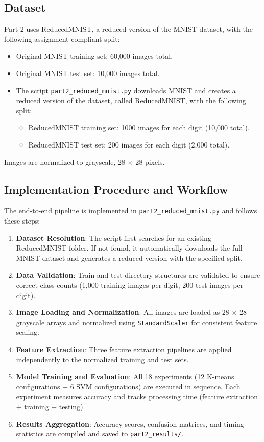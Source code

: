 \subsection{Dataset}

Part 2 uses ReducedMNIST, a reduced version of the MNIST dataset, with the following assignment-compliant split:

\begin{itemize}
    \item Original MNIST training set: 60,000 images total.
    \item Original MNIST test set: 10,000 images total.
    \item The script \texttt{part2\_reduced\_mnist.py} downloads MNIST and creates a reduced version of the dataset, called ReducedMNIST, with the following split:
        \begin{itemize}
            \item ReducedMNIST training set: 1000 images for each digit (10,000 total).
            \item ReducedMNIST test set: 200 images for each digit (2,000 total).
        \end{itemize}
\end{itemize}

Images are normalized to grayscale, 28 × 28 pixels.

\subsection{Implementation Procedure and Workflow}

The end-to-end pipeline is implemented in \texttt{part2\_reduced\_mnist.py} and follows these steps:

\begin{enumerate}
    \item \textbf{Dataset Resolution}: The script first searches for an existing ReducedMNIST folder. If not found, it automatically downloads the full MNIST dataset and generates a reduced version with the specified split.
    \item \textbf{Data Validation}: Train and test directory structures are validated to ensure correct class counts (1,000 training images per digit, 200 test images per digit).
    \item \textbf{Image Loading and Normalization}: All images are loaded as 28 × 28 grayscale arrays and normalized using \texttt{StandardScaler} for consistent feature scaling.
    \item \textbf{Feature Extraction}: Three feature extraction pipelines are applied independently to the normalized training and test sets.
    \item \textbf{Model Training and Evaluation}: All 18 experiments (12 K-means configurations + 6 SVM configurations) are executed in sequence. Each experiment measures accuracy and tracks processing time (feature extraction + training + testing).
    \item \textbf{Results Aggregation}: Accuracy scores, confusion matrices, and timing statistics are compiled and saved to \texttt{part2\_results/}.
\end{enumerate}


